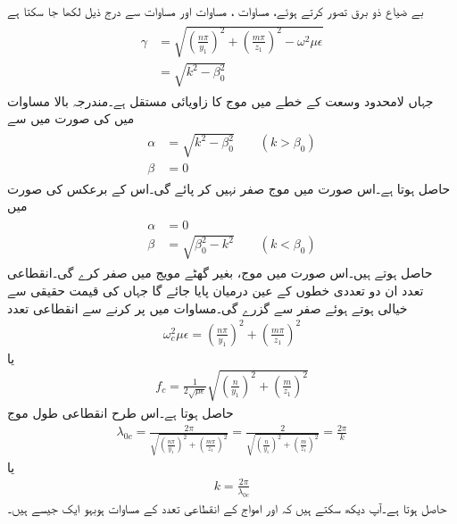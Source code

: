 بے ضیاع ذو برق  تصور کرتے ہوئے، مساوات ،  مساوات  اور مساوات  سے درج ذیل لکھا جا سکتا ہے
\begin{gather}
\begin{aligned}\label{مساوات_مویج_عرضی_مقناطیسی_مستقل_موج}
\gamma&=\sqrt{\left(\frac{n\pi}{y_1}\right)^2+\left(\frac{m\pi}{z_1}\right)^2-\omega^2 \mu \epsilon}\\
&=\sqrt{k^2-\beta_0^2}
\end{aligned}
\end{gather}
جہاں  لامحدود وسعت کے خطے میں موج کا زاویائی مستقل  ہے۔مندرجہ بالا مساوات میں  کی صورت میں  سے
\begin{gather}
\begin{aligned}\label{مساوات_مویج_تضعیفی_مستقل_الف}
\alpha&=\sqrt{k^2-\beta_0^2}  \quad \quad (k>\beta_0)\\
\beta &=0
\end{aligned}
\end{gather}
حاصل ہوتا ہے۔اس صورت میں موج صفر نہیں کر پائے گی۔اس کے برعکس  کی صورت میں
\begin{gather}
\begin{aligned}\label{مساوات_مویج_زاویائی_مستقل_الف}
\alpha&=0\\
\beta &= \sqrt{\beta_0^2-k^2}  \quad \quad (k<\beta_0)
\end{aligned}
\end{gather}
حاصل ہوتے ہیں۔اس صورت میں موج، بغیر گھٹے مویج میں صفر کرے گی۔انقطاعی تعدد ان دو تعددی خطوں کے عین درمیان پایا جائے گا جہاں  کی قیمت حقیقی سے خیالی ہوتے ہوئے صفر سے گزرے گی۔مساوات  میں  پر کرنے سے انقطاعی تعدد
\begin{align}
\omega_c^2 \mu \epsilon =\left(\frac{n\pi}{y_1}\right)^2+\left(\frac{m\pi}{z_1}\right)^2
\end{align}
یا
\begin{align}
f_c =\frac{1}{2 \sqrt{\mu \epsilon}}\sqrt{\left(\frac{n}{y_1}\right)^2+\left(\frac{m}{z_1}\right)^2}
\end{align}
حاصل ہوتا ہے۔اس طرح انقطاعی طول موج
\begin{align}\label{مساوات_مویج_مستطیلی_انقطاعی_طول}
\lambda_{0c}=\frac{2\pi}{\sqrt{\left(\frac{n\pi}{y_1}\right)^2+\left(\frac{m\pi}{z_1}\right)^2}}=\frac{2}{\sqrt{\left(\frac{n}{y_1}\right)^2+\left(\frac{m}{z_1}\right)^2}}=\frac{2\pi}{k}
\end{align}
یا
\begin{align}
k=\frac{2\pi}{\lambda_{0c}}
\end{align}
حاصل ہوتا ہے۔آپ دیکھ سکتے ہیں کہ  اور  امواج کے انقطاعی تعدد کے مساوات ہوبہو ایک جیسے ہیں۔

